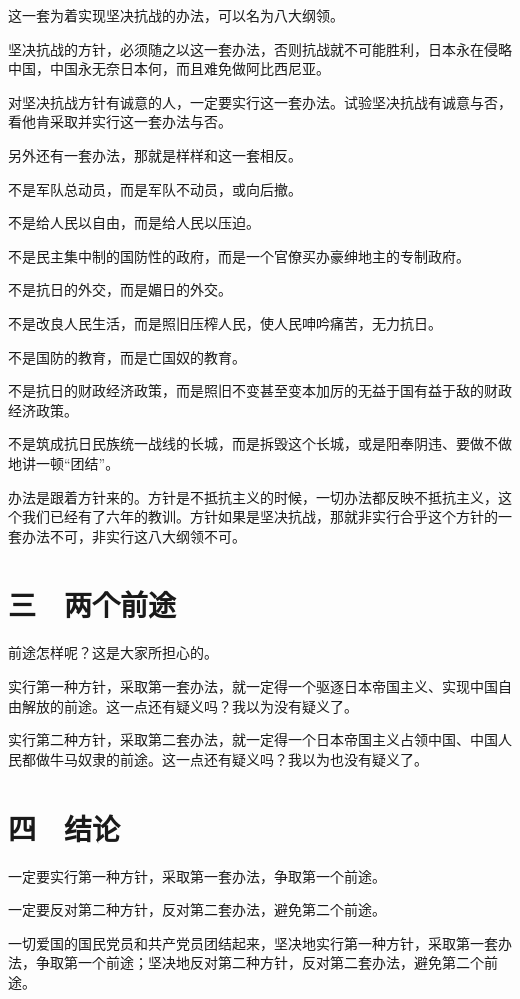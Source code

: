 这一套为着实现坚决抗战的办法，可以名为八大纲领。

坚决抗战的方针，必须随之以这一套办法，否则抗战就不可能胜利，日本永在侵略中国，中国永无奈日本何，而且难免做阿比西尼亚。

对坚决抗战方针有诚意的人，一定要实行这一套办法。试验坚决抗战有诚意与否，看他肯采取并实行这一套办法与否。

另外还有一套办法，那就是样样和这一套相反。

不是军队总动员，而是军队不动员，或向后撤。

不是给人民以自由，而是给人民以压迫。

不是民主集中制的国防性的政府，而是一个官僚买办豪绅地主的专制政府。

不是抗日的外交，而是媚日的外交。

不是改良人民生活，而是照旧压榨人民，使人民呻吟痛苦，无力抗日。

不是国防的教育，而是亡国奴的教育。

不是抗日的财政经济政策，而是照旧不变甚至变本加厉的无益于国有益于敌的财政经济政策。

不是筑成抗日民族统一战线的长城，而是拆毁这个长城，或是阳奉阴违、要做不做地讲一顿“团结”。

办法是跟着方针来的。方针是不抵抗主义的时候，一切办法都反映不抵抗主义，这个我们已经有了六年的教训。方针如果是坚决抗战，那就非实行合乎这个方针的一套办法不可，非实行这八大纲领不可。

\section{三　两个前途}

前途怎样呢？这是大家所担心的。

实行第一种方针，采取第一套办法，就一定得一个驱逐日本帝国主义、实现中国自由解放的前途。这一点还有疑义吗？我以为没有疑义了。

实行第二种方针，采取第二套办法，就一定得一个日本帝国主义占领中国、中国人民都做牛马奴隶的前途。这一点还有疑义吗？我以为也没有疑义了。

\section{四　结论}

一定要实行第一种方针，采取第一套办法，争取第一个前途。

一定要反对第二种方针，反对第二套办法，避免第二个前途。

一切爱国的国民党员和共产党员团结起来，坚决地实行第一种方针，采取第一套办法，争取第一个前途；坚决地反对第二种方针，反对第二套办法，避免第二个前途。

